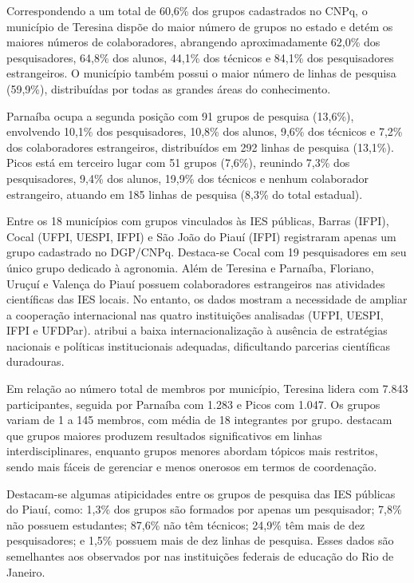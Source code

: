 \documentclass[portuguese]{textolivre}
\begin{document}
Correspondendo a um total de 60,6\% dos grupos cadastrados no CNPq, o município de Teresina dispõe do maior número de grupos no estado e detém os maiores números de colaboradores, abrangendo aproximadamente 62,0\% dos pesquisadores, 64,8\% dos alunos, 44,1\% dos técnicos e 84,1\% dos pesquisadores estrangeiros. O município também possui o maior número de linhas de pesquisa (59,9\%), distribuídas por todas as grandes áreas do conhecimento.

Parnaíba ocupa a segunda posição com 91 grupos de pesquisa (13,6\%), envolvendo 10,1\% dos pesquisadores, 10,8\% dos alunos, 9,6\% dos técnicos e 7,2\% dos colaboradores estrangeiros, distribuídos em 292 linhas de pesquisa (13,1\%). Picos está em terceiro lugar com 51 grupos (7,6\%), reunindo 7,3\% dos pesquisadores, 9,4\% dos alunos, 19,9\% dos técnicos e nenhum colaborador estrangeiro, atuando em 185 linhas de pesquisa (8,3\% do total estadual).

Entre os 18 municípios com grupos vinculados às IES públicas, Barras (IFPI), Cocal (UFPI, UESPI, IFPI) e São João do Piauí (IFPI) registraram apenas um grupo cadastrado no DGP/CNPq. Destaca-se Cocal com 19 pesquisadores em seu único grupo dedicado à agronomia.
Além de Teresina e Parnaíba, Floriano, Uruçuí e Valença do Piauí possuem colaboradores estrangeiros nas atividades científicas das IES locais. No entanto, os dados mostram a necessidade de ampliar a cooperação internacional nas quatro instituições analisadas (UFPI, UESPI, IFPI e UFDPar). \textcite{ramos2018} atribui a baixa internacionalização à ausência de estratégias nacionais e políticas institucionais adequadas, dificultando parcerias científicas duradouras.

Em relação ao número total de membros por município, Teresina lidera com 7.843 participantes, seguida por Parnaíba com 1.283 e Picos com 1.047. Os grupos variam de 1 a 145 membros, com média de 18 integrantes por grupo. \textcite{verbree2011} destacam que grupos maiores produzem resultados significativos em linhas interdisciplinares, enquanto grupos menores abordam tópicos mais restritos, sendo mais fáceis de gerenciar e menos onerosos em termos de coordenação.

Destacam-se algumas atipicidades entre os grupos de pesquisa das IES públicas do Piauí, como: 1,3\% dos grupos são formados por apenas um pesquisador; 7,8\% não possuem estudantes; 87,6\% não têm técnicos; 24,9\% têm mais de dez pesquisadores; e 1,5\% possuem mais de dez linhas de pesquisa. Esses dados são semelhantes aos observados por \textcite{miano2020} nas instituições federais de educação do Rio de Janeiro.
\end{document}
